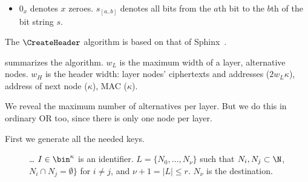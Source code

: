 \begin{itemize}
  \item \(0_x\) denotes \(x\) zeroes.
    \(s_{[a..b]}\) denotes all bits from the \(a\)th bit to the \(b\)th of the 
    bit string \(s\).
\end{itemize}


The \(\CreateHeader\) algorithm is based on that of Sphinx~\cite[\S 
3.2]{Sphinx}.

 summarizes the algorithm.
\(w_L\) is the maximum width of a layer, \ie alternative nodes.
\(w_H\) is the header width:
layer nodes' ciphertexts and addresses ($2w_L\kappa$),
address of next node ($\kappa$),
\ac{MAC} ($\kappa$).

We reveal the maximum number of alternatives per layer.
But we do this in ordinary \ac{OR} too, since there is only one node per layer.

First we generate all the needed keys.

\begin{figure}
  \caption{\label{fig:CreateHeader}%
    \dots
      $I\in \bin^\kappa$ is an identifier.
      $L = \{N_0, \dotsc, N_\nu\}$ such that $N_i, N_j\subset \N$, $N_i\cap N_j 
      = \emptyset\}$ for $i\neq j$, and $\nu+1 = |L| \leq r$.
      $N_\nu$ is the destination.
  }
\end{figure}

